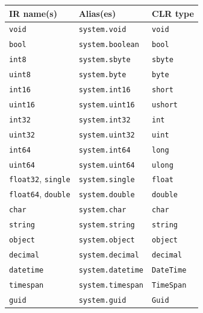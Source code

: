 \documentclass[11pt,a4paper]{article}
\begin{document}
\begin{longtable}{lll}
  \toprule
  \textbf{IR name(s)} & \textbf{Alias(es)} & \textbf{CLR type} \\
  \midrule
  \endhead
  \texttt{void}                       & \texttt{system.void}     & \texttt{void}     \\
  \texttt{bool}                       & \texttt{system.boolean}  & \texttt{bool}     \\
  \texttt{int8}                       & \texttt{system.sbyte}    & \texttt{sbyte}    \\
  \texttt{uint8}                      & \texttt{system.byte}     & \texttt{byte}     \\
  \texttt{int16}                      & \texttt{system.int16}    & \texttt{short}    \\
  \texttt{uint16}                     & \texttt{system.uint16}   & \texttt{ushort}   \\
  \texttt{int32}                      & \texttt{system.int32}    & \texttt{int}      \\
  \texttt{uint32}                     & \texttt{system.uint32}   & \texttt{uint}     \\
  \texttt{int64}                      & \texttt{system.int64}    & \texttt{long}     \\
  \texttt{uint64}                     & \texttt{system.uint64}   & \texttt{ulong}    \\
  \texttt{float32}, \texttt{single}   & \texttt{system.single}   & \texttt{float}    \\
  \texttt{float64}, \texttt{double}   & \texttt{system.double}   & \texttt{double}   \\
  \texttt{char}                       & \texttt{system.char}     & \texttt{char}     \\
  \texttt{string}                     & \texttt{system.string}   & \texttt{string}   \\
  \texttt{object}                     & \texttt{system.object}   & \texttt{object}   \\
  \texttt{decimal}                    & \texttt{system.decimal}  & \texttt{decimal}  \\
  \texttt{datetime}                   & \texttt{system.datetime} & \texttt{DateTime} \\
  \texttt{timespan}                   & \texttt{system.timespan} & \texttt{TimeSpan} \\
  \texttt{guid}                       & \texttt{system.guid}     & \texttt{Guid}     \\
  \bottomrule
\end{longtable}
\end{document}
